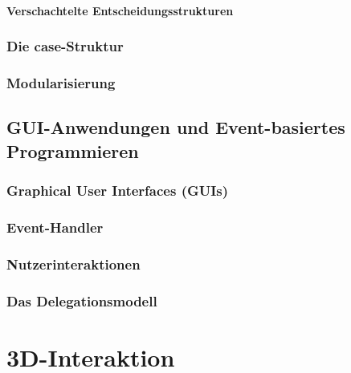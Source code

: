 \documentclass[a4paper, 11pt, accentcolor = tud3b]{tudreport}
\begin{document}
					\paragraph{Verschachtelte Entscheidungsstrukturen} %

				\subsubsection{Die case-Struktur} %

				\subsubsection{Modularisierung} %

			\subsection{GUI-Anwendungen und Event-basiertes Programmieren} %

				\subsubsection{Graphical User Interfaces (GUIs)} %

				\subsubsection{Event-Handler} %

				\subsubsection{Nutzerinteraktionen} %

				\subsubsection{Das Delegationsmodell} %

		\section{3D-Interaktion} %
\end{document}
